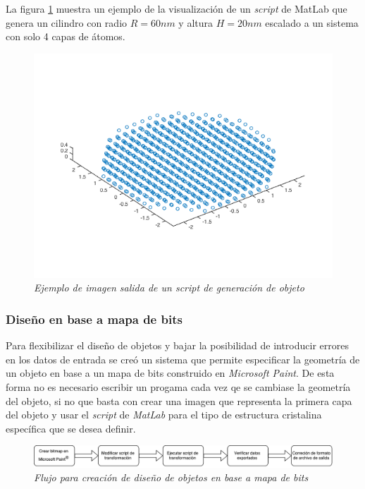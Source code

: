 La figura \ref{procesoactualacript} muestra un ejemplo de la visualización de un \emph{script} de MatLab que genera un cilindro con radio $R = 60nm$ y altura $H = 20nm$ escalado a un sistema con solo 4 capas de átomos.

\begin{figure}[ht]
  \centering
  \includegraphics[scale=.6]{images/procesoActualScript}
  \caption{\em Ejemplo de imagen salida de un \emph{script} de generación de objeto}
  \label{procesoactualacript}
\end{figure}

\subsubsection{Diseño en base a mapa de bits}
\label{intro:procesoactualmapa}

Para flexibilizar el diseño de objetos y bajar la posibilidad de introducir errores en los datos de entrada se creó un sistema que permite especificar la geometría de un objeto en base a un mapa de bits construido en \emph{Microsoft Paint}. De esta forma no es necesario escribir un progama cada vez qe se cambiase la geometría del objeto, si no que basta con crear una imagen que representa la primera capa del objeto y usar el \emph{script} de \emph{MatLab} para el tipo de estructura cristalina específica que se desea definir.

\begin{figure}[ht]
  \centering
  \includegraphics[scale=.5]{images/procesoActualBitmapFlujo}
  \caption{\em Flujo para creación de diseño de objetos en base a mapa de bits}
  \label{procesoActualBitmapFlujo}
\end{figure}

